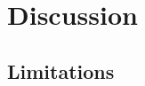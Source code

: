 \section{Discussion}
\label{sec:discussion}


%


\subsection{Limitations}
\label{subsec:limitations}

%
